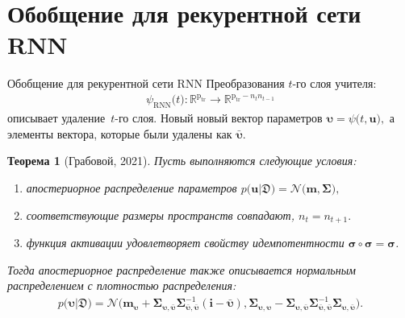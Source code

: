 \documentclass[10pt,pdf,hyperref={unicode}]{beamer}
\newtheorem{rustheorem}{Теорема}
\begin{document}
\section{Обобщение для рекурентной сети RNN}
\begin{frame}{Обобщение для рекурентной сети RNN}
\justifying
Преобразования $t$-го слоя учителя:
\[
\begin{aligned}
\psi_{\text{RNN}}\bigr(t\bigr) : \mathbb{R}^{\text{p}_{\text{tr}}} \to \mathbb{R}^{\text{p}_{\text{tr}}-n_tn_{t-1}}
\end{aligned}
\]
описывает удаление~$t$-го слоя. Новый новый вектор параметров $\bm{\upsilon} = \psi\bigr(t, \mathbf{u}\bigr),$ а элементы вектора, которые были удалены как $\bar{\bm{\upsilon}}.$

\begin{rustheorem}[Грабовой, 2021]
\justifying
Пусть выполняются следующие условия:
\begin{enumerate}[1)]
\item апостериорное распределение параметров $p\bigr(\mathbf{u}|\mathfrak{D}\bigr) = \mathcal{N}\bigr(\mathbf{m}, \bm{\Sigma}\bigr),$
\item соответствующие размеры пространств совпадают, $n_t=n_{t+1}.$
\item функция активации удовлетворяет свойству идемпотентности $\bm{\sigma} \circ \bm{\sigma} = \bm{\sigma}$.
\end{enumerate}
Тогда апостериорное распределение также описывается нормальным распределением с плотностью распределения:
\[
\label{eq:ap:5}
\begin{aligned}
p\bigr(\bm{\upsilon}|\mathfrak{D}\bigr) = \mathcal{N}\bigr(\mathbf{m}_{\bm{\upsilon}}+\bm{\Sigma}_{\bm{\upsilon},\bar{\bm{\upsilon}}} \bm{\Sigma}_{\bar{\bm{\upsilon}},\bar{\bm{\upsilon}}}^{-1} \left(\mathbf{i} - \bar{\bm{\upsilon}}\right), \bm{\Sigma}_{\bm{\upsilon},\bm{\upsilon}} - \bm{\Sigma}_{\bm{\upsilon},\bar{\bm{\upsilon}}}\bm{\Sigma}_{\bar{\bm{\upsilon}},\bar{\bm{\upsilon}}}^{-1}\bm{\Sigma}_{\bm{\upsilon},\bar{\bm{\upsilon}}}\bigr).
\end{aligned}
\]
\end{rustheorem}
    
\end{frame}

\end{document}
